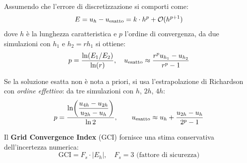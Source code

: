 Assumendo che l'errore di discretizzazione si comporti come:
\begin{equation}
  E = u_h - u_{\rm esatto} = k \cdot h^p + \mathcal{O}(h^{p+1})
\end{equation}
dove $h$ è la lunghezza caratteristica e $p$ l'ordine di convergenza, da due simulazioni con
$h_1$ e $h_2 = r h_1$ si ottiene:
\begin{equation}
  p = \frac{\ln(E_1/E_2)}{\ln(r)}, \quad
  u_{\rm esatto} \approx \frac{r^p u_{h_1} - u_{h_2}}{r^p - 1}
\end{equation}

Se la soluzione esatta non è nota a priori, si usa l'estrapolazione di Richardson con
\emph{ordine effettivo}: da tre simulazioni con $h$, $2h$, $4h$:
\begin{equation}
  p = \frac{\ln\!\left(\dfrac{u_{4h}-u_{2h}}{u_{2h}-u_h}\right)}{\ln 2}, \qquad
  u_{\rm esatto} \approx u_h + \frac{u_{2h}-u_h}{2^p - 1}
\end{equation}

Il \textbf{Grid Convergence Index} (GCI) fornisce una stima conservativa dell'incertezza
numerica:
\begin{equation}
  \text{GCI} = F_s \cdot |E_h|, \quad F_s = 3 \text{ (fattore di sicurezza)}
\end{equation}